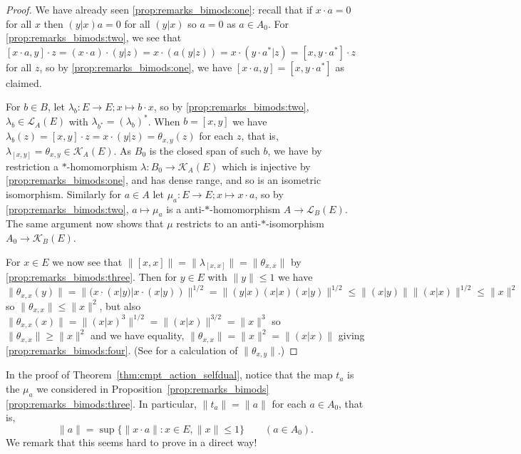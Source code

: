 \documentclass[a4paper,11pt]{article}
\theoremstyle{plain}
\theoremstyle{remark}
\newenvironment{remark}
  {\pushQED{\qed}\renewcommand{\qedsymbol}{$\triangle$}\remarkx}
  {\popQED\endremarkx}
\newcommand{\mc}[1]{\mathcal{#1}}
\begin{document}
\begin{proof}
We have already seen \ref{prop:remarks_bimods:one}: recall that if $x\cdot a=0$ for all $x$ then $(y|x)a=0$ for all $(y|x)$ so $a=0$ as $a\in A_0$.  For \ref{prop:remarks_bimods:two}, we see that $[x\cdot a,y]\cdot z = (x\cdot a) \cdot (y|z) = x\cdot (a(y|z)) = x \cdot (y\cdot a^*|z) = [x,y\cdot a^*]\cdot z$ for all $z$, so by \ref{prop:remarks_bimods:one}, we have $[x\cdot a,y] = [x,y\cdot a^*]$ as claimed.

For $b\in B$, let $\lambda_b \colon E \to E; x\mapsto b\cdot x$, so by \ref{prop:remarks_bimods:two}, $\lambda_b \in \mc L_A(E)$ with $\lambda_{b^*} = (\lambda_b)^*$.  When $b = [x,y]$ we have $\lambda_b(z) = [x,y]\cdot z = x\cdot(y|z) = \theta_{x,y}(z)$ for each $z$, that is, $\lambda_{[x,y]} = \theta_{x,y} \in \mc K_A(E)$.  As $B_0$ is the closed span of such $b$, we have by restriction a $*$-homomorphism $\lambda \colon B_0 \to \mc K_A(E)$ which is injective by \ref{prop:remarks_bimods:one}, and has dense range, and so is an isometric isomorphism.  Similarly for $a\in A$ let $\mu_a \colon E\to E; x\mapsto x\cdot a$, so by \ref{prop:remarks_bimods:two}, $a\mapsto\mu_a$ is a anti-$*$-homomorphism $A \to \mc L_B(E)$.  The same argument now shows that $\mu$ restricts to an anti-$*$-isomorphism $A_0 \to \mc K_B(E)$.

For $x\in E$ we now see that $\| [x,x] \| = \| \lambda_{[x,x]} \| = \| \theta_{x,x} \|$ by \ref{prop:remarks_bimods:three}.  Then for $y\in E$ with $\|y\|\leq 1$ we have $\| \theta_{x,x}(y) \| = \| ( x\cdot(x|y) | x\cdot(x|y) ) \|^{1/2} = \| (y|x) (x|x) (x|y) \|^{1/2} \leq \| (x|y) \| \| (x|x) \|^{1/2} \leq \|x\|^{2}$ so $\|\theta_{x,x}\| \leq \|x\|^2$, but also $\| \theta_{x,x}(x)\| = \| (x|x)^3 \|^{1/2} = \| (x|x) \|^{3/2} = \|x\|^3$ so $\|\theta_{x,x} \| \geq \|x\|^2$ and we have equality, $\| \theta_{x,x} \| = \|x\|^2 = \| (x|x) \|$ giving \ref{prop:remarks_bimods:four}.  (See \cite[Proposition~1.7]{BMS_quasimults} for a calculation of $\|\theta_{x,y}\|$.)
\end{proof}


\begin{remark}
In the proof of Theorem~\ref{thm:cmpt_action_selfdual}, notice that the map $t_a$ is the $\mu_a$ we considered in Proposition~\ref{prop:remarks_bimods}\ref{prop:remarks_bimods:three}.  In particular, $\|t_a\| = \|a\|$ for each $a\in A_0$, that is,
\begin{equation}\label{eq:norm_A_action}
\|a\| = \sup\bigl\{ \|x\cdot a\| : x\in E, \|x\|\leq 1 \bigr\} \qquad (a\in A_0).
\end{equation}
We remark that this seems hard to prove in a direct way!
\end{remark}
\end{document}
